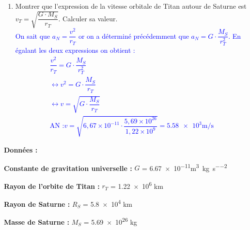 \documentclass[a4paper,12pt]{article}
\newenvironment{itemize*}%
  {\begin{itemize}[label=$-$]%
    \setlength{\itemsep}{0pt}%
    \setlength{\parskip}{0pt}}%
  {\end{itemize}}
\begin{document}
\begin{enumerate}
\textcolor{blue}{On constate que la composante $a_T$ est nulle, or on sait que $a_T = \dfrac{dv}{dt}=0$ ce qui implique que la vitesse, primitive de l'accélération, est constante sur toute l'orbite. Le mouvement est donc circulaire et uniforme.}
	\item Montrer que l'expression de la vitesse orbitale de Titan autour de Saturne est $v_T = \sqrt{\dfrac{G \cdot M_S}{r_T}}$. Calculer sa valeur.\\
\textcolor{blue}{On sait que $a_N = \dfrac{v^2}{r_T}$ or on a déterminé précédemment que $a_N = G \cdot \dfrac{M_S }{r_T^2}$. En égalant les deux expressions on obtient : 
\begin{eqnarray}
	\dfrac{v^2}{r_T} = G \cdot \dfrac{M_S }{r_T^2}  \nonumber \\
	\leftrightarrow v^2 = G \cdot \dfrac{M_S }{r_T} \nonumber \\
	\leftrightarrow v = \sqrt{G \cdot \dfrac{M_S }{r_T}} \nonumber \\
	\text{AN :} v = \sqrt{6,67\times 10^{-11} \cdot \dfrac{5,69 \times 10^{26} }{1,22 \times 10^{9}}} =\num{5,58e3} \unit{\meter \per \second} \nonumber
\end{eqnarray}}
\end{enumerate}
\textbf{Données :}
\begin{itemize*}
	\item \textbf{Constante de gravitation universelle :} $G$ = \num{6,67e-11}\unit{ \meter \cubed \per \kilo \gram \per \second \squared}
	\item \textbf{Rayon de l'orbite de Titan :} $r_T$ = \num{1,22e6} \unit{\kilo \meter}
	\item \textbf{Rayon de Saturne :} $R_S$ = \num{5,8e4} \unit{\kilo \meter}
	\item \textbf{Masse de Saturne :} $M_S$ = \num{5,69e26} \unit{\kilo \gram}
\end{itemize*}
\end{document}
